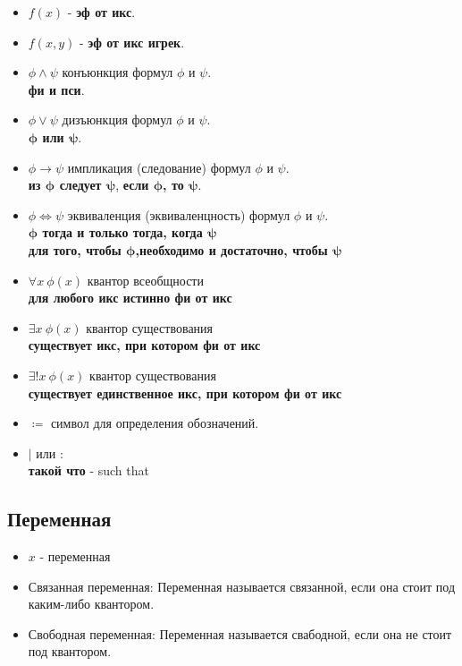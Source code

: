 \documentclass[fleqn,11pt]{article}
\theoremstyle{definition}
\begin{document}
\begin{itemize}
    \item $f(x)$ - \textbf{эф от икс}.
    \item $f(x,y)$ - \textbf{эф от икс игрек}.
    \item $\phi \land \psi$ конъюнкция формул $\phi$ и $\psi$. ~\\
    \textbf{фи и пси}.
    \item $\phi \lor \psi$ дизъюнкция формул $\phi$ и $\psi$. ~\\
    \textbf{$\boldsymbol{\phi}$ или $\boldsymbol{\psi}$}.
    \item $\phi \rightarrow \psi$ импликация (следование) формул $\phi$ и $\psi$. ~\\
    \textbf{из $\boldsymbol{\phi}$ следует $\boldsymbol{\psi}$},
		\textbf{если $\boldsymbol{\phi}$, то $\boldsymbol{\psi}$}.
    \item $\phi \iff \psi$ эквиваленция (эквиваленцность) формул $\phi$ и $\psi$. ~\\
    \textbf{$\boldsymbol{\phi}$ тогда и только тогда, когда $\boldsymbol{\psi}$} ~\\
    \textbf{для того, чтобы $\boldsymbol{\phi}$,необходимо и достаточно, чтобы $\boldsymbol{\psi}$}
    \item $\forall x \: \phi(x)$ квантор всеобщности ~\\
    \textbf{для любого икс истинно фи от икс}
    \item $\exists x \: \phi(x)$ квантор существования ~\\
    \textbf{существует икс, при котором фи от икс}
    \item $\exists! x \: \phi(x)$ квантор существования ~\\
    \textbf{существует единственное икс, при котором фи от икс}
    \item $\coloneqq$ символ для определения обозначений. ~\\
	\item $\left.\mid \right.$ или $:$ ~\\
	\textbf{такой что} - such that \\
\end{itemize}

\subsection{Переменная}
\begin{itemize}
    \item $x$ - переменная
    \item Связанная переменная: Переменная называется связанной, если она стоит под каким-либо квантором.
    \item Свободная переменная: Переменная называется свабодной, если она не стоит под квантором.
\end{itemize}
\end{document}
